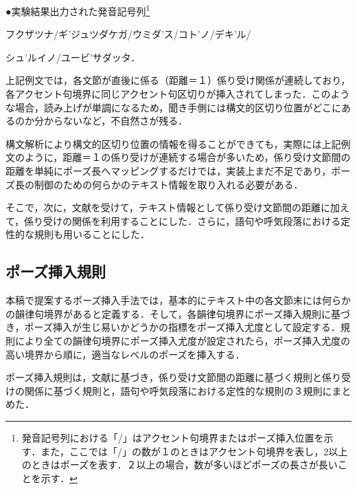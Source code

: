 \hspace*{0.5cm}●実験結果出力された発音記号列\footnote{発音記号列における「/」はアクセント句境界またはポーズ挿入位置を示す．また，ここでは「/」の数が１のときはアクセント句境界を表し，2以上のときはポーズを表す．２以上の場合，数が多いほどポーズの長さが長いことを示す．}

\hspace*{1.1cm}フクザツナ/ギ’ジュツダケガ/ウミダ’ス/コト’ノ/デキ’ル/

\hspace*{1cm}シュ’ルイノ/ユービ’サダッタ．

\vspace{0.4cm}

上記例文では，各文節が直後に係る（距離＝１）係り受け関係が連続しており，各アクセント句境界に同じアクセント句区切りが挿入されてしまった．このような場合，読み上げが単調になるため，聞き手側には構文的区切り位置がどこにあるのか分からないなど，不自然さが残る．

構文解析により構文的区切り位置の情報を得ることができても，実際には上記例文のように，距離＝１の係り受けが連続する場合が多い\cite{丸山1992,張1997}ため，係り受け文節間の距離を単純にポーズ長へマッピングするだけでは，実装上まだ不足であり，ポーズ長の制御のための何らかのテキスト情報を取り入れる必要がある．

そこで，次に，文献\cite{箱田1989}を受けて，テキスト情報として係り受け文節間の距離に加えて，係り受けの関係を利用することにした．さらに，語句や呼気段落における定性的な規則も用いることにした．

\subsection{ポーズ挿入規則}
\label{kisokupose}

本稿で提案するポーズ挿入手法では，基本的にテキスト中の各文節末には何らかの韻律句境界があると定義する．そして，各韻律句境界にポーズ挿入規則に基づき，ポーズ挿入が生じ易いかどうかの指標をポーズ挿入尤度として設定する．規則により全ての韻律句境界にポーズ挿入尤度が設定されたら，ポーズ挿入尤度の高い境界から順に，適当なレベルのポーズを挿入する．

ポーズ挿入規則は，文献\cite{箱田1989}に基づき，係り受け文節間の距離に基づく規則と係り受けの関係に基づく規則と，語句や呼気段落における定性的な規則の３規則にまとめた．

